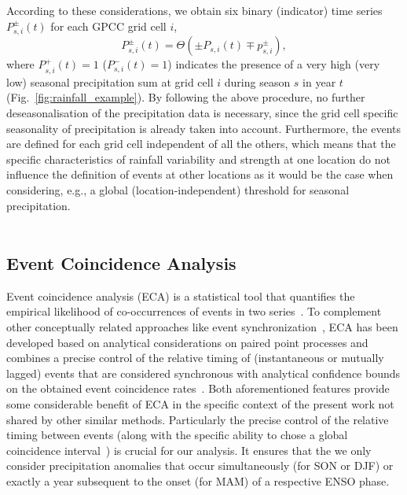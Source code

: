 \documentclass[utf8]{frontiersSCNS} %
\begin{document}
According to these considerations, we obtain six binary (indicator) time series $P^\pm_{s,i}(t)$ for each GPCC grid cell $i$,
\begin{equation}
  P^\pm_{s,i}(t) = \Theta(\pm P_{s,i}(t) \mp p^\pm_{s,i}),
\end{equation}
where $P^{+}_{s,i}(t)=1$ ($P^{-}_{s,i}(t)=1$) indicates the presence of a very high (very low) seasonal precipitation sum at grid cell $i$ during season $s$ in year $t$ (Fig.~\ref{fig:rainfall_example}). By following the above procedure, no further deseasonalisation of the precipitation data is necessary, since the grid cell specific seasonality of precipitation is already taken into account. Furthermore, the events are defined for each grid cell independent of all the others, which means that the specific characteristics of rainfall variability and strength at one location do not influence the definition of events at other locations as it would be the case when considering, e.g., a global (location-independent) threshold for seasonal precipitation.\\\\

\subsection{Event Coincidence Analysis}\label{sec:eca}

Event coincidence analysis (ECA) is a statistical tool that quantifies the empirical likelihood of co-occurrences of events in two series~\citep{donges_nonlinear_2011,rammig_coincidences_2015, Donges2016a}. To complement other conceptually related approaches like event synchronization~\citep{quian_quiroga_event_2002,boers2014prediction, malik2010spatial}, ECA has been developed based on analytical considerations on paired point processes and combines a precise control of the relative timing of (instantaneous or mutually lagged) events that are considered synchronous with analytical confidence bounds on the obtained event coincidence rates~\citep{donges_nonlinear_2011,Donges2016a}. Both aforementioned features provide some considerable benefit of ECA in the specific context of the present work not shared by other similar methods. Particularly the precise control of the relative timing between events (along with the specific ability to chose a global coincidence interval~\citep{wolf2020event}) is crucial for our analysis. It ensures that the we only consider precipitation anomalies that occur simultaneously (for SON or DJF) or exactly a year subsequent to the onset (for MAM) of a respective ENSO phase. 
\end{document}
